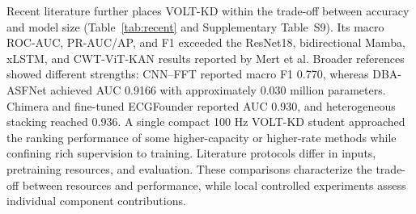 \documentclass[11pt,a4paper]{article}
\begin{document}
Recent literature further places VOLT-KD within the trade-off between accuracy and model size (Table~\ref{tab:recent} and Supplementary Table~S9). Its macro ROC-AUC, PR-AUC/AP, and F1 exceeded the ResNet18, bidirectional Mamba, xLSTM, and CWT-ViT-KAN results reported by Mert et al. Broader references showed different strengths: CNN--FFT reported macro F1 0.770, whereas DBA-ASFNet achieved AUC 0.9166 with approximately 0.030 million parameters. Chimera and fine-tuned ECGFounder reported AUC 0.930, and heterogeneous stacking reached 0.936. A single compact 100 Hz VOLT-KD student approached the ranking performance of some higher-capacity or higher-rate methods while confining rich supervision to training. Literature protocols differ in inputs, pretraining resources, and evaluation. These comparisons characterize the trade-off between resources and performance, while local controlled experiments assess individual component contributions.
\end{document}
